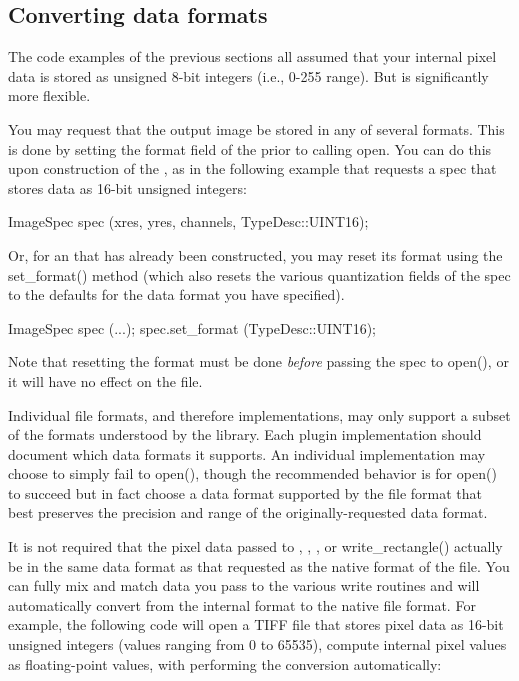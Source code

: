 \subsection{Converting data formats}
\label{sec:imageoutput:convertingformats}

The code examples of the previous sections all assumed that your
internal pixel data is stored as unsigned 8-bit integers (i.e., 0-255
range).  But \product is significantly more flexible.  

You may request that the output image be stored in any of several
formats.  This is done by setting the {\kw format} field of the
\ImageSpec prior to calling {\kw open}.  You can do this upon
construction of the \ImageSpec, as in the following example
that requests a spec that stores data as 16-bit unsigned integers:
\begin{code}
        ImageSpec spec (xres, yres, channels, TypeDesc::UINT16);
\end{code}

\noindent Or, for an \ImageSpec that has already been
constructed, you may reset its format using the {\kw set_format()}
method (which also resets the various quantization fields of the
spec to the defaults for the data format you have specified).  

\begin{code}
        ImageSpec spec (...);
        spec.set_format (TypeDesc::UINT16);
\end{code}

Note that resetting the format must be done \emph{before} passing the
spec to {\kw open()}, or it will have no effect on the file.

Individual file formats, and therefore \ImageOutput implementations, may
only support a subset of the formats understood by the \product library.
Each \ImageOutput plugin implementation should document which data
formats it supports.  An individual \ImageOutput implementation may
choose to simply fail to {\kw open()}, though the recommended behavior
is for {\kw open()} to succeed but in fact choose a data format
supported by the file format that best preserves the precision and range
of the originally-requested data format.

It is not required that the pixel data passed to \writeimage,
\writescanline, \writetile, or {\kw write_rectangle()} actually be in
the same data format as that requested as the native format of the file.
You can fully mix and match data you pass to the various {\kw write}
routines and \product will automatically convert from the internal
format to the native file format.  For example, the following code will
open a TIFF file that stores pixel data as 16-bit unsigned integers
(values ranging from 0 to 65535), compute internal pixel values as
floating-point values, with \writeimage performing the conversion
automatically:

